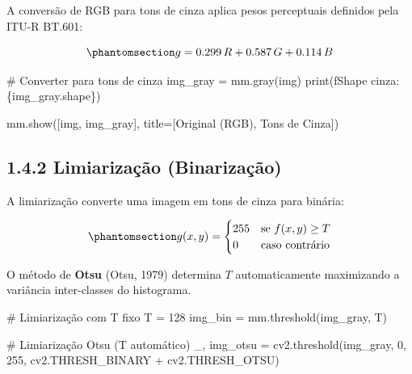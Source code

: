 \documentclass[
  portuguese,
  letterpaper,
  openany,
  oneside,
  12pt,
  a4paper]{book}
\newenvironment{Shaded}{\begin{snugshade}}{\end{snugshade}}
\newcommand{\BuiltInTok}[1]{\textcolor[rgb]{0.00,0.23,0.31}{#1}}
\newcommand{\CommentTok}[1]{\textcolor[rgb]{0.37,0.37,0.37}{#1}}
\newcommand{\DecValTok}[1]{\textcolor[rgb]{0.68,0.00,0.00}{#1}}
\newcommand{\NormalTok}[1]{\textcolor[rgb]{0.00,0.23,0.31}{#1}}
\newcommand{\OperatorTok}[1]{\textcolor[rgb]{0.37,0.37,0.37}{#1}}
\newcommand{\SpecialCharTok}[1]{\textcolor[rgb]{0.37,0.37,0.37}{#1}}
\newcommand{\SpecialStringTok}[1]{\textcolor[rgb]{0.13,0.47,0.30}{#1}}
\newcommand{\StringTok}[1]{\textcolor[rgb]{0.13,0.47,0.30}{#1}}
\begin{document}
\begin{tcolorbox}
A conversão de RGB para tons de cinza aplica pesos perceptuais definidos
pela ITU-R BT.601:

\begin{equation}\phantomsection\label{eq-1-cinza}{g = 0.299\,R + 0.587\,G + 0.114\,B}\end{equation}

\begin{Shaded}
\begin{Highlighting}[]
\CommentTok{\# Converter para tons de cinza}
\NormalTok{img\_gray }\OperatorTok{=}\NormalTok{ mm.gray(img)}
\BuiltInTok{print}\NormalTok{(}\SpecialStringTok{f\textquotesingle{}Shape cinza: }\SpecialCharTok{\{}\NormalTok{img\_gray}\SpecialCharTok{.}\NormalTok{shape}\SpecialCharTok{\}}\SpecialStringTok{\textquotesingle{}}\NormalTok{)}

\NormalTok{mm.show([img, img\_gray], title}\OperatorTok{=}\NormalTok{[}\StringTok{\textquotesingle{}Original (RGB)\textquotesingle{}}\NormalTok{, }\StringTok{\textquotesingle{}Tons de Cinza\textquotesingle{}}\NormalTok{])}
\end{Highlighting}
\end{Shaded}

\subsection{1.4.2 Limiarização
(Binarização)}\label{limiarizauxe7uxe3o-binarizauxe7uxe3o-1}

A limiarização converte uma imagem em tons de cinza para binária:

\begin{equation}\phantomsection\label{eq-1-limiar}{g(x,y) = \begin{cases} 255 & \text{se } f(x,y) \geq T \\ 0 & \text{caso contrário} \end{cases}}\end{equation}

O método de \textbf{Otsu} (Otsu, 1979) determina \(T\) automaticamente
maximizando a variância inter-classes do histograma.

\begin{Shaded}
\begin{Highlighting}[]
\CommentTok{\# Limiarização com T fixo}
\NormalTok{T }\OperatorTok{=} \DecValTok{128}
\NormalTok{img\_bin }\OperatorTok{=}\NormalTok{ mm.threshold(img\_gray, T)}

\CommentTok{\# Limiarização Otsu (T automático)}
\NormalTok{\_, img\_otsu }\OperatorTok{=}\NormalTok{ cv2.threshold(img\_gray, }\DecValTok{0}\NormalTok{, }\DecValTok{255}\NormalTok{,}
\NormalTok{                             cv2.THRESH\_BINARY }\OperatorTok{+}\NormalTok{ cv2.THRESH\_OTSU)}


\end{Highlighting}
\end{Shaded}
\end{tcolorbox}
\end{document}
